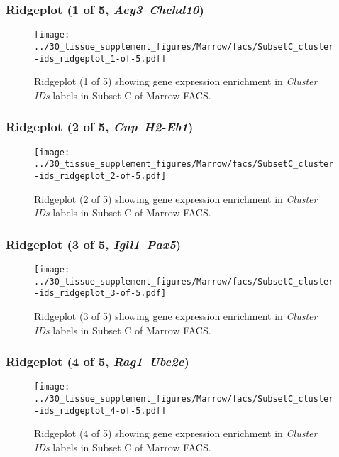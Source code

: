 \clearpage

\subsubsection{Ridgeplot (1 of 5, \emph{Acy3}--\emph{Chchd10})}
\begin{figure}[h]
\centering
\texttt{[image: ../30\_tissue\_supplement\_figures/Marrow/facs/SubsetC\_cluster-ids\_ridgeplot\_1-of-5.pdf]}

\caption{ Ridgeplot (1 of 5)  showing gene expression enrichment in \emph{Cluster IDs} labels in Subset C of Marrow FACS. }
\end{figure}


\clearpage

\subsubsection{Ridgeplot (2 of 5, \emph{Cnp}--\emph{H2-Eb1})}
\begin{figure}[h]
\centering
\texttt{[image: ../30\_tissue\_supplement\_figures/Marrow/facs/SubsetC\_cluster-ids\_ridgeplot\_2-of-5.pdf]}

\caption{ Ridgeplot (2 of 5)  showing gene expression enrichment in \emph{Cluster IDs} labels in Subset C of Marrow FACS. }
\end{figure}


\clearpage

\subsubsection{Ridgeplot (3 of 5, \emph{Igll1}--\emph{Pax5})}
\begin{figure}[h]
\centering
\texttt{[image: ../30\_tissue\_supplement\_figures/Marrow/facs/SubsetC\_cluster-ids\_ridgeplot\_3-of-5.pdf]}

\caption{ Ridgeplot (3 of 5)  showing gene expression enrichment in \emph{Cluster IDs} labels in Subset C of Marrow FACS. }
\end{figure}


\clearpage

\subsubsection{Ridgeplot (4 of 5, \emph{Rag1}--\emph{Ube2c})}
\begin{figure}[h]
\centering
\texttt{[image: ../30\_tissue\_supplement\_figures/Marrow/facs/SubsetC\_cluster-ids\_ridgeplot\_4-of-5.pdf]}

\caption{ Ridgeplot (4 of 5)  showing gene expression enrichment in \emph{Cluster IDs} labels in Subset C of Marrow FACS. }
\end{figure}


